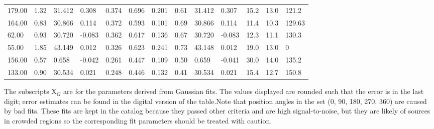 \begin{table}[htp]
{\begin{tabular}{lllllllllllll}
179.00 & 1.32 & 31.412 & 0.308 & 0.374 & 0.696 & 0.201 & 0.61 & 31.412 & 0.307 & 15.2 & 13.0 & 121.2 \\
164.00 & 0.83 & 30.866 & 0.114 & 0.372 & 0.593 & 0.101 & 0.69 & 30.866 & 0.114 & 11.4 & 10.3 & 129.63 \\
62.00 & 0.93 & 30.720 & -0.083 & 0.362 & 0.617 & 0.136 & 0.67 & 30.720 & -0.083 & 12.3 & 11.1 & 130.3 \\
55.00 & 1.85 & 43.149 & 0.012 & 0.326 & 0.623 & 0.241 & 0.73 & 43.148 & 0.012 & 19.0 & 13.0 & 0 \\
156.00 & 0.57 & 0.658 & -0.042 & 0.261 & 0.447 & 0.109 & 0.50 & 0.659 & -0.041 & 30.0 & 14.0 & 135.2 \\
133.00 & 0.90 & 30.534 & 0.021 & 0.248 & 0.446 & 0.132 & 0.41 & 30.534 & 0.021 & 15.4 & 12.7 & 150.8 \\
\hline
\end{tabular}
}\par
The subscripts X${_G}$ are for the parameters derived from Gaussian fits.  The values displayed are rounded such that the error is in the last digit; error estimates can be found in the digital version of the table.Note that position angles in the set (0, 90, 180, 270, 360) are caused by bad fits.  These fits are kept in the catalog because they passed other criteria and are high signal-to-noise, but they are likely of sources in crowded regions so the corresponding fit parameters should be treated with caution.
\end{table}
